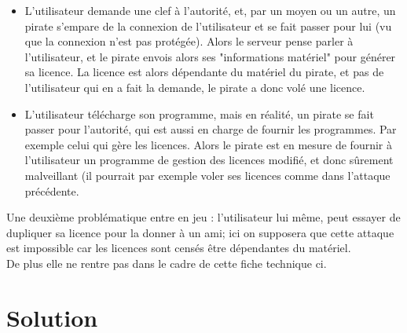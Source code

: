 \documentclass{article}
\begin{document}
\begin{itemize}
    \item L'utilisateur demande une clef à l'autorité, et, par un moyen ou un autre, un pirate s'empare de la connexion de l'utilisateur et se fait passer pour lui (vu que la connexion n'est pas protégée). Alors le serveur pense parler à l'utilisateur, et le pirate envois alors ses "informations matériel" pour générer sa licence. La licence est alors dépendante du matériel du pirate, et pas de l'utilisateur qui en a fait la demande, le pirate a donc volé une licence.
    \item L'utilisateur télécharge son programme, mais en réalité, un pirate se fait passer pour l'autorité, qui est aussi en charge de fournir les programmes. Par exemple celui qui gère les licences. Alors le pirate est en mesure de fournir à l'utilisateur un programme de gestion des licences modifié, et donc sûrement malveillant (il pourrait par exemple voler ses licences comme dans l'attaque précédente.
\end{itemize}

Une deuxième problématique entre en jeu : l'utilisateur lui même, peut essayer de dupliquer sa licence pour la donner à un ami; ici on supposera que cette attaque est impossible car les licences sont censés être dépendantes du matériel.\\
De plus elle ne rentre pas dans le cadre de cette fiche technique ci.

\section{Solution}
\end{document}
